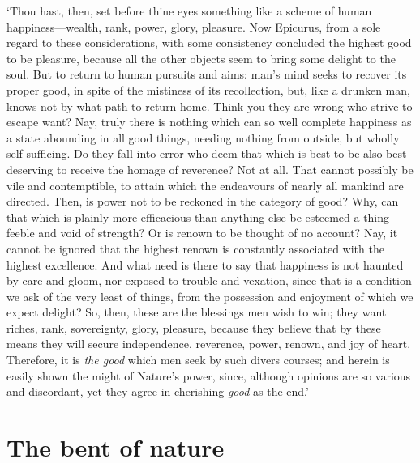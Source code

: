 \documentclass[11pt]{book}
\begin{document}
`Thou hast, then, set before thine eyes something like a scheme of human
happiness---wealth, rank, power, glory, pleasure. Now Epicurus, from a
sole regard to these considerations, with some consistency concluded the
highest good to be pleasure, because all the other objects seem to bring
some delight to the soul. But to return to human pursuits and aims:
man's mind seeks to recover its proper good, in spite of the mistiness
of its recollection, but, like a drunken man, knows not by what path to
return home. Think you they are wrong who strive to escape want? Nay,
truly there is nothing which can so well complete happiness as a state
abounding in all good things, needing nothing from outside, but wholly
self-sufficing. Do they fall into error who deem that which is best to
be also best deserving to receive the homage of reverence? Not at all.
That cannot possibly be vile and contemptible, to attain which the
endeavours of nearly all mankind are directed. Then, is power not to be
reckoned in the category of good? Why, can that which is plainly more
efficacious than anything else be esteemed a thing feeble and void of
strength? Or is renown to be thought of no account? Nay, it cannot be
ignored that the highest renown is constantly associated with the
highest excellence. And what need is there to say that happiness is not
haunted by care and gloom, nor exposed to trouble and vexation, since
that is a condition we ask of the very least of things, from the
possession and enjoyment of which we expect delight? So, then, these are
the blessings men wish to win; they want riches, rank, sovereignty,
glory, pleasure, because they believe that by these means they will
secure independence, reverence, power, renown, and joy of heart.
Therefore, it is \emph{the good} which men seek by such divers courses; and
herein is easily shown the might of Nature's power, since, although
opinions are so various and discordant, yet they agree in cherishing
\emph{good} as the end.'




\section{The bent of nature}
\end{document}
